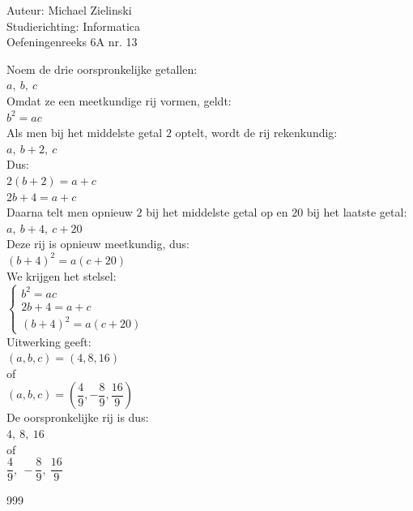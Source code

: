 \documentclass[a4paper]{article}
\begin{document}
  
\noindent \large Auteur: Michael Zielinski \\
\noindent \large Studierichting: Informatica\\
\noindent \large Oefeningenreeks 6A nr. 13\\

\medskip

\normalsize

Noem de drie oorspronkelijke getallen: \\

$ a,\ b,\ c $ \\

Omdat ze een meetkundige rij vormen, geldt: \\

$ b^2 = ac $ \\

Als men bij het middelste getal $2$ optelt, wordt de rij rekenkundig: \\

$ a,\ b+2,\ c $ \\

Dus: \\

$ 2(b+2)=a+c $ \\

$ 2b+4=a+c $ \\

Daarna telt men opnieuw $2$ bij het middelste getal op en $20$ bij het laatste getal: \\

$ a,\ b+4,\ c+20 $ \\

Deze rij is opnieuw meetkundig, dus: \\

$ (b+4)^2=a(c+20) $ \\

We krijgen het stelsel: \\

$ 
\left\{
\begin{array}{l}
b^2=ac \\
2b+4=a+c \\
(b+4)^2=a(c+20)
\end{array}
\right.
$ \\

Uitwerking geeft: \\

$ (a,b,c)=(4,8,16) $ \\

of \\

$ (a,b,c)=\left(\dfrac{4}{9},-\dfrac{8}{9},\dfrac{16}{9}\right) $ \\

De oorspronkelijke rij is dus: \\

$ \boxed{4,\ 8,\ 16} $ \\

of \\

$ \boxed{\dfrac{4}{9},\ -\dfrac{8}{9},\ \dfrac{16}{9}} $ \\

\begin{thebibliography}{999}
\end{thebibliography}
\end{document}
